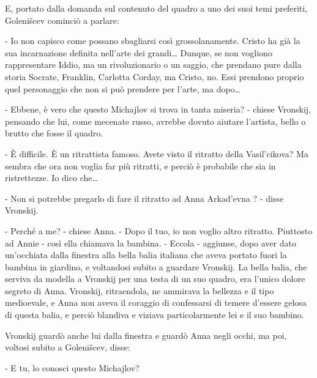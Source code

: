 E, portato dalla domanda sul contenuto del quadro a uno dei suoi temi preferiti, Golenišcev cominciò a parlare: 

- Io non capisco come possano sbagliarsi così grossolanamente. Cristo ha già la sua incarnazione definita nell'arte dei grandi\ldots{} Dunque, se non vogliono rappresentare Iddio, ma un rivoluzionario o un saggio, che prendano pure dalla storia Socrate, Franklin, Carlotta Corday, ma Cristo, no. Essi prendono proprio quel personaggio che non si può prendere per l'arte, ma dopo\ldots{} 

- Ebbene, è vero che questo Michajlov si trova in tanta miseria? - chiese Vronskij, pensando che lui, come mecenate russo, avrebbe dovuto aiutare l'artista, bello o brutto che fosse il quadro. 

- È difficile. È un ritrattista famoso. Avete visto il ritratto della Vasil'cikova? Ma sembra che ora non voglia far più ritratti, e perciò è probabile che sia in ristrettezze. Io dico che\ldots{} 

- Non si potrebbe pregarlo di fare il ritratto ad Anna Arkad'evna ? - disse Vronskij. 

- Perché a me? - chiese Anna. - Dopo il tuo, io non voglio altro ritratto. Piuttosto ad Annie - così ella chiamava la bambina. - Eccola - aggiunse, dopo aver dato un'occhiata dalla finestra alla bella balia italiana che aveva portato fuori la bambina in giardino, e voltandosi subito a guardare Vronskij. La bella balia, che serviva da modella a Vronskij per una testa di un suo quadro, era l'unico dolore segreto di Anna. Vronskij, ritraendola, ne ammirava la bellezza e il tipo medioevale, e Anna non aveva il coraggio di confessarsi di temere d'essere gelosa di questa balia, e perciò blandiva e viziava particolarmente lei e il suo bambino. 

Vronskij guardò anche lui dalla finestra e guardò Anna negli occhi, ma poi, voltosi subito a Golenišcev, disse: 

- E tu, lo conosci questo Michajlov? 

